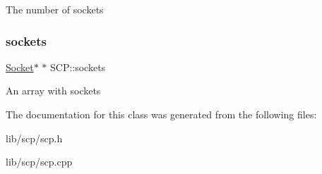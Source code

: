 The number of sockets \hypertarget{class_s_c_p_a47df7b56ee4f566f9a59198eaf8e52e7}{}\label{class_s_c_p_a47df7b56ee4f566f9a59198eaf8e52e7} 
\subsubsection{\texorpdfstring{sockets}{sockets}}
{\footnotesize\ttfamily \hyperlink{class_socket}{Socket}$\ast$ $\ast$ S\+C\+P\+::sockets\hspace{0.3cm}{\ttfamily [private]}}

An array with sockets 

The documentation for this class was generated from the following files\+:\begin{DoxyCompactItemize}
\item 
lib/scp/scp.\+h\item 
lib/scp/scp.\+cpp\end{DoxyCompactItemize}
